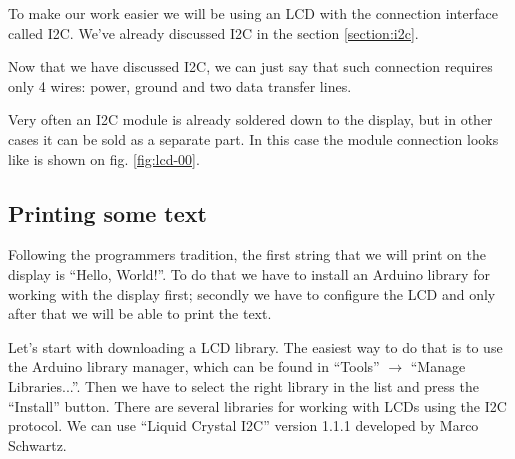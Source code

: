 \documentclass[../sparc.tex]{subfiles}
\begin{document}
To make our work easier we will be using an LCD with the connection interface
called \gls{I2C}. We've already discussed I2C in the section \ref{section:i2c}.

Now that we have discussed I2C, we can just say that such connection requires
only 4 wires: power, ground and two data transfer lines.

Very often an I2C module is already soldered down to the display, but in other
cases it can be sold as a separate part. In this case the module connection
looks like is shown on fig. \ref{fig:lcd-00}.



\subsection{Printing some text}


Following the programmers tradition, the first string that we will print on the
display is ``Hello, World!''.  To do that we have to install an Arduino library
for working with the display first; secondly we have to configure the LCD and
only after that we will be able to print the text.

Let's start with downloading a LCD library.  The easiest way to do that is to
use the Arduino library manager, which can be found in ``Tools'' $\rightarrow$ ``Manage
Libraries...''.  Then we have to select the right library in the list and press
the ``Install'' button.  There are several libraries for working with LCDs using
the \gls{I2C} protocol.  We can use ``Liquid Crystal I2C'' version 1.1.1
developed by Marco Schwartz.
\end{document}
